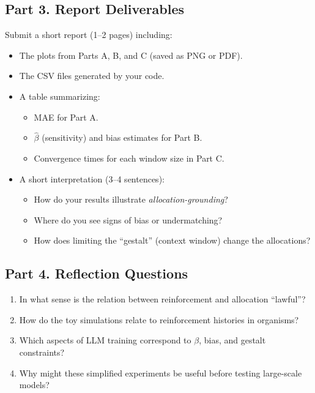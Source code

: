 \subsection*{Part 3. Report Deliverables}
Submit a short report (1--2 pages) including:
\begin{itemize}[leftmargin=*]
  \item The plots from Parts A, B, and C (saved as PNG or PDF).
  \item The CSV files generated by your code.
  \item A table summarizing:
    \begin{itemize}
      \item MAE for Part A.
      \item $\hat{\beta}$ (sensitivity) and bias estimates for Part B.
      \item Convergence times for each window size in Part C.
    \end{itemize}
  \item A short interpretation (3--4 sentences):
    \begin{itemize}
      \item How do your results illustrate \emph{allocation-grounding}?
      \item Where do you see signs of bias or undermatching?
      \item How does limiting the ``gestalt'' (context window) change the allocations?
    \end{itemize}
\end{itemize}

\subsection*{Part 4. Reflection Questions}
\begin{enumerate}[leftmargin=*]
  \item In what sense is the relation between reinforcement and allocation ``lawful''?
  \item How do the toy simulations relate to reinforcement histories in organisms?
  \item Which aspects of LLM training correspond to $\beta$, bias, and gestalt constraints?
  \item Why might these simplified experiments be useful before testing large-scale models?
\end{enumerate}

